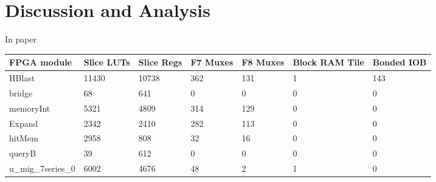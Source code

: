 \section{Discussion and Analysis}
\label{sec:introduction}

In paper \cite{vipin2019}

\begin{table}[]
\begin{tabular}{|l|l|l|l|l|l|l|}
\hline
FPGA module        & Slice LUTs & Slice Regs & F7 Muxes & F8 Muxes & Block RAM Tile & Bonded IOB \\ \hline
HBlast             & 11430      & 10738      & 362      & 131      & 1              & 143        \\
bridge             & 68         & 641        & 0        & 0        & 0              & 0          \\
memoryInt          & 5321       & 4809       & 314      & 129      & 0              & 0          \\
Expand             & 2342       & 2410       & 282      & 113      & 0              & 0          \\
hitMem             & 2958       & 808        & 32       & 16       & 0              & 0          \\
queryB             & 39         & 612        & 0        & 0        & 0              & 0          \\
u\_mig\_7series\_0 & 6002       & 4676       & 48       & 2        & 1              & 0          \\ \hline
\end{tabular}
\end{table}

